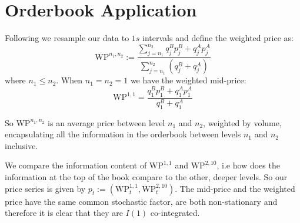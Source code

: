 %
%
%
%
%
%
%
\section{Orderbook Application}

Following \cite{CAO2009} we resample our data to $1s$ intervals and define the weighted price as:
\begin{equation}
    \text{WP}^{n_{1}, n_{2}} := \frac{\sum_{j=n_{1}}^{n_{2}} q_{j}^B p_{j}^B + q_{j}^A p_{j}^A}{\sum_{j=n_{1}}^{n_{2}} (q^B_{j} + q^A_{j})}
\end{equation}
where $n_{1} \leq n_{2}$. When $n_{1} = n_{2} = 1$ we have the weighted mid-price:
\begin{equation}
    \text{WP}^{1,1} = \frac{q_{1}^B p_{1}^B + q_{1}^A p_{1}^A}{q_{1}^B + q_{1}^A}
\end{equation}

So $\text{WP}^{n_{1},n_{2}}$ is an average price between level $n_{1}$ and $n_{2}$, weighted by volume, encapsulating all the information in the orderbook between levels $n_{1}$ and $n_{2}$ inclusive.

We compare the information content of $\text{WP}^{1,1}$ and $\text{WP}^{2,10}$, i.e how does the information
at the top of the book compare to the other, deeper levels.
So our price series is given by $p_t := (\text{WP}^{1,1}_t, \text{WP}^{2,10}_t)$.
The mid-price and the weighted price have the same common stochastic factor,
are both non-stationary and therefore it is clear that they are $I(1)$ co-integrated.

